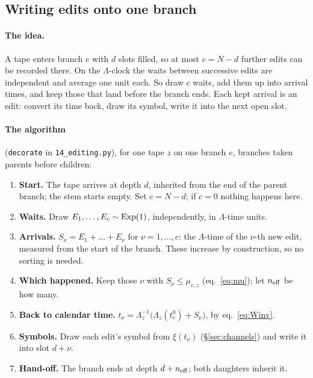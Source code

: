 \subsection{Writing edits onto one branch}\label{sec:sampler}

\paragraph{The idea.} A tape enters branch $e$ with $d$ slots filled, so at most $c=N-d$ further edits
can be recorded there. On the $\Lambda$-clock the waits between successive edits are independent and
average one unit each. So draw $c$ waits, add them up into arrival times, and keep those that land
before the branch ends. Each kept arrival is an edit: convert its time back, draw its symbol, write it
into the next open slot.

\paragraph{The algorithm} (\texttt{decorate} in \texttt{14\_editing.py}), for one tape $z$ on one
branch $e$, branches taken parents before children:
\begin{enumerate}
  \item \textbf{Start.} The tape arrives at depth $d$, inherited from the end of the parent branch;
        the stem starts empty. Set $c=N-d$; if $c=0$ nothing happens here.
  \item \textbf{Waits.} Draw $E_1,\dots,E_c\sim\operatorname{Exp}(1)$, independently, in $\Lambda$-time units.
  \item \textbf{Arrivals.} $S_\nu=E_1+\dots+E_\nu$ for $\nu=1,\dots,c$: the $\Lambda$-time of the
        $\nu$-th new edit, measured from the start of the branch. These increase by construction, so
        no sorting is needed.
  \item \textbf{Which happened.} Keep those $\nu$ with $S_\nu\le\mu_{e,z}$ (eq.~\ref{eq:mu}); let
        $n_{\rm eff}$ be how many.
  \item \textbf{Back to calendar time.}
        $t_\nu=\Lambda_z^{-1}\big(\Lambda_z(t_e^0)+S_\nu\big)$, by eq.~\eqref{eq:Winv}.
  \item \textbf{Symbols.} Draw each edit's symbol from $\xi(t_\nu)$ (\S\ref{sec:channels}) and write
        it into slot $d+\nu$.
  \item \textbf{Hand-off.} The branch ends at depth $d+n_{\rm eff}$; both daughters inherit it.
\end{enumerate}

